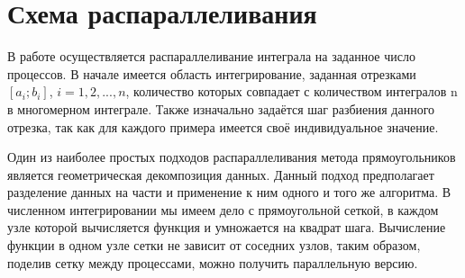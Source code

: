 \documentclass{report}
\begin{document}
\section*{Схема распараллеливания}
В работе осуществляется распараллеливание интеграла на заданное число процессов. В начале имеется область интегрирование, заданная отрезками $[a_{i}; b_{i}]$, $i = 1, 2, ..., n$, количество которых совпадает с количеством интегралов n в многомерном интеграле. Также изначально задаётся шаг разбиения данного отрезка, так как для каждого примера имеется своё индивидуальное значение.
\par Один из наиболее простых подходов распараллеливания метода прямоугольников является геометрическая декомпозиция данных. Данный подход предполагает разделение данных на части и применение к ним одного и того же алгоритма. В численном интегрировании мы имеем дело с прямоугольной сеткой, в каждом узле которой вычисляется функция и умножается на квадрат шага. Вычисление функции в одном узле сетки не зависит от соседних узлов, таким образом, поделив сетку между процессами, можно получить параллельную версию.
\newpage
\end{document}
